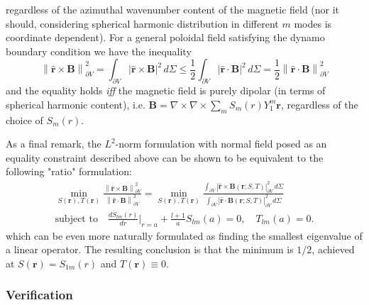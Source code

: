 \documentclass[a4paper, 11pt]{article}
\begin{document}
regardless of the azimuthal wavenumber content of the magnetic field (nor it should, considering spherical harmonic distribution in different $m$ modes is coordinate dependent).
For a general poloidal field satisfying the dynamo boundary condition we have the inequality
\begin{equation}
    \left\|\hat{\mathbf{r}}\times \mathbf{B}\right\|^2_{\partial V} = \int_{\partial V} \left|\hat{\mathbf{r}}\times \mathbf{B}\right|^2 \, d\Sigma \leq \frac{1}{2} \int_{\partial V} \left|\hat{\mathbf{r}}\cdot \mathbf{B}\right|^2 \, d\Sigma = \frac{1}{2}\left\|\hat{\mathbf{r}}\cdot \mathbf{B}\right\|^2_{\partial V}
\end{equation}
and the equality holds \textit{iff} the magnetic field is purely dipolar (in terms of spherical harmonic content), i.e. $\mathbf{B} = \nabla\times \nabla\times \sum_m S_m(r) Y_1^m \mathbf{r}$, regardless of the choice of $S_m(r)$.

As a final remark, the $L^2$-norm formulation with normal field posed as an equality constraint described above can be shown to be equivalent to the following "ratio" formulation:
\begin{equation}
    \begin{gathered}
        \min_{S(\mathbf{r}),T(\mathbf{r})} \frac{\left\|\hat{\mathbf{r}}\times \mathbf{B}\right\|^2_{\partial V}}{\left\|\hat{\mathbf{r}}\cdot \mathbf{B}\right\|^2_{\partial V}} = \min_{S(\mathbf{r}), T(\mathbf{r})} \frac{\int_{\partial V} |\hat{\mathbf{r}} \times \mathbf{B}(\mathbf{r}; S, T)|_{\partial V}^2 \, d\Sigma}{\int_{\partial V} |\hat{\mathbf{r}} \cdot \mathbf{B}(\mathbf{r}; S, T)|_{\partial V}^2 \, d\Sigma} \\[.5em] 
        \text{subject to} \quad \frac{dS_{lm}(r)}{dr} \bigg|_{r=a} + \frac{l+1}{a} S_{lm}(a) = 0,\quad T_{lm}(a) = 0.
    \end{gathered}
\end{equation}
which can be even more naturally formulated as finding the smallest eigenvalue of a linear operator. The resulting conclusion is that the minimum is $1/2$, achieved at $S(\mathbf{r}) = S_{1m}(r)$ and $T(\mathbf{r})\equiv 0$.

\subsubsection{Verification}
\end{document}
